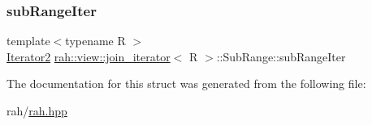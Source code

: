 \mbox{\label{structrah_1_1view_1_1join__iterator_1_1_sub_range_a4073148b86fc958e754b23af1befce93}} 
\subsubsection{\texorpdfstring{subRangeIter}{subRangeIter}}
{\footnotesize\ttfamily template$<$typename R $>$ \\
\mbox{\hyperlink{structrah_1_1view_1_1join__iterator_ae03a066174f3422c70d0e3c22e68d9f7}{Iterator2}} \mbox{\hyperlink{structrah_1_1view_1_1join__iterator}{rah\+::view\+::join\+\_\+iterator}}$<$ R $>$\+::Sub\+Range\+::sub\+Range\+Iter}



The documentation for this struct was generated from the following file\+:\begin{DoxyCompactItemize}
\item 
rah/\mbox{\hyperlink{rah_8hpp}{rah.\+hpp}}\end{DoxyCompactItemize}
